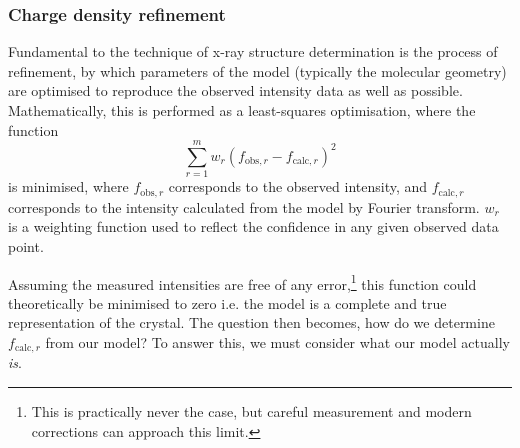 \begin{refsection}
\subsubsection{Charge density refinement}
\label{sec:cd}
Fundamental to the technique of x-ray structure determination is the process of refinement, by which parameters of the model (typically the molecular geometry) are optimised to reproduce the observed intensity data as well as possible.
Mathematically, this is performed as a least-squares optimisation, where the function
\begin{equation}
    \sum^{m}_{r=1} w_{r} \left(f_{\mathrm{obs}, r} - f_{\mathrm{calc}, r} \right) ^{2}
\end{equation}
is minimised, where $f_{\mathrm{obs}, r}$ corresponds to the observed intensity, and $f_{\mathrm{calc}, r}$ corresponds to the intensity calculated from the model by Fourier transform.
$w_{r}$ is a weighting function used to reflect the confidence in any given observed data point.

Assuming the measured intensities are free of any error,\footnote{This is practically never the case, but careful measurement and modern corrections can approach this limit.} this function could theoretically be minimised to zero i.e. the model is a complete and true representation of the crystal.
The question then becomes, how do we determine $f_{\mathrm{calc}, r}$ from our model?
To answer this, we must consider what our model actually \emph{is}.


\end{refsection}
